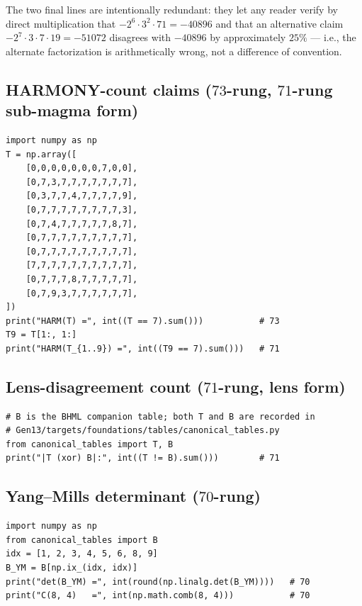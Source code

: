 \documentclass[11pt,reqno]{amsart}
\theoremstyle{definition}
\begin{document}
The two final lines are intentionally redundant: they let any reader
verify by direct multiplication that $-2^6 \cdot 3^2 \cdot 71 = -40896$
and that an alternative claim $-2^7 \cdot 3 \cdot 7 \cdot 19 = -51072$
disagrees with $-40896$ by approximately $25\%$ — i.e., the alternate
factorization is arithmetically wrong, not a difference of convention.

\subsection{HARMONY-count claims ($73$-rung, $71$-rung sub-magma form)}
\label{subsec:harm-snippet}

\begin{lstlisting}[style=plainpy]
import numpy as np
T = np.array([
    [0,0,0,0,0,0,0,7,0,0],
    [0,7,3,7,7,7,7,7,7,7],
    [0,3,7,7,4,7,7,7,7,9],
    [0,7,7,7,7,7,7,7,7,3],
    [0,7,4,7,7,7,7,7,8,7],
    [0,7,7,7,7,7,7,7,7,7],
    [0,7,7,7,7,7,7,7,7,7],
    [7,7,7,7,7,7,7,7,7,7],
    [0,7,7,7,8,7,7,7,7,7],
    [0,7,9,3,7,7,7,7,7,7],
])
print("HARM(T) =", int((T == 7).sum()))           # 73
T9 = T[1:, 1:]
print("HARM(T_{1..9}) =", int((T9 == 7).sum()))   # 71
\end{lstlisting}

\subsection{Lens-disagreement count ($71$-rung, lens form)}
\label{subsec:lens-snippet}

\begin{lstlisting}[style=plainpy]
# B is the BHML companion table; both T and B are recorded in
# Gen13/targets/foundations/tables/canonical_tables.py
from canonical_tables import T, B
print("|T (xor) B|:", int((T != B).sum()))        # 71
\end{lstlisting}

\subsection{Yang--Mills determinant ($70$-rung)}
\label{subsec:ym-det-snippet}

\begin{lstlisting}[style=plainpy]
import numpy as np
from canonical_tables import B
idx = [1, 2, 3, 4, 5, 6, 8, 9]
B_YM = B[np.ix_(idx, idx)]
print("det(B_YM) =", int(round(np.linalg.det(B_YM))))   # 70
print("C(8, 4)   =", int(np.math.comb(8, 4)))           # 70
\end{lstlisting}
\end{document}
